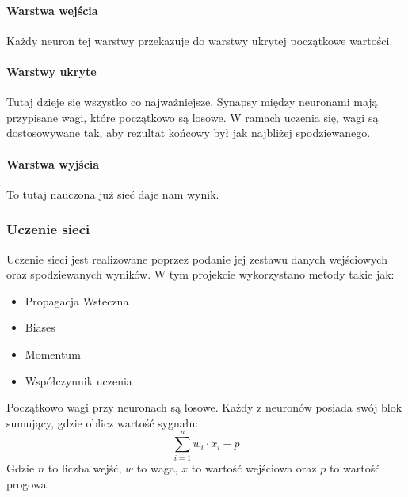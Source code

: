 \documentclass[12pt,a4paper]{article}
\begin{document}
\paragraph*{Warstwa wejścia} Każdy neuron tej warstwy przekazuje do warstwy ukrytej początkowe wartości.
\paragraph*{Warstwy ukryte} Tutaj dzieje się wszystko co najważniejsze. Synapsy między neuronami mają przypisane wagi, które początkowo są losowe. W ramach uczenia się, wagi są dostosowywane tak, aby rezultat końcowy był jak najbliżej spodziewanego.
\paragraph*{Warstwa wyjścia} To tutaj nauczona już sieć daje nam wynik.
\subsubsection*{Uczenie sieci}
Uczenie sieci jest realizowane poprzez podanie jej zestawu danych wejściowych oraz spodziewanych wyników. W tym projekcie wykorzystano metody takie jak:
\begin{itemize}
\item Propagacja Wsteczna
\item Biases
\item Momentum
\item Współczynnik uczenia
\end{itemize}
Początkowo wagi przy neuronach są losowe. Każdy z neuronów posiada swój blok sumujący, gdzie oblicz wartość sygnału:
$$ \sum_{i=1}^{n}{w_i\cdot x_i - p} $$
Gdzie $n$ to liczba wejść, $w$ to waga, $x$ to wartość wejściowa oraz $p$ to wartość progowa.
\end{document}
